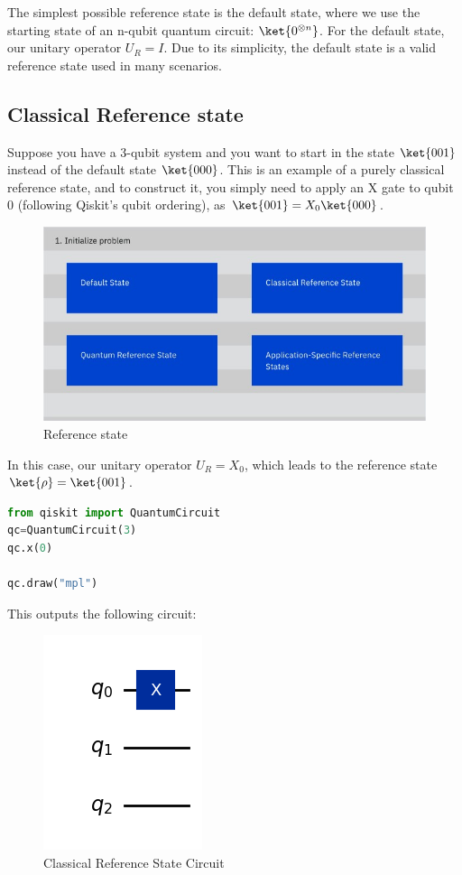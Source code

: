 \documentclass[12pt, oneside]{book}
\theoremstyle{definition}
\theoremstyle{definition}
\theoremstyle{remark}
\begin{document}
The simplest possible reference state is the default state, where we use the starting state of an n-qubit quantum circuit: $\ket{0^{\otimes n}}$. For the default state, our unitary operator $U_R=I$. Due to its simplicity, the default state is a valid reference state used in many scenarios.

\subsection{Classical Reference state}
Suppose you have a 3-qubit system and you want to start in the state $\ket{001}$ instead of the default state $\ket{000}$. This is an example of a purely classical reference state, and to construct it, you simply need to apply an X gate to qubit 0 (following Qiskit's qubit ordering), as $\ket{001}=X_0\ket{000}$.
\begin{figure}[H]
    \centering
    \includegraphics[width=0.25\linewidth]{../images/ref_state.png}
    \caption{Reference state}
    \label{fig:ref_state}
\end{figure}
In this case, our unitary operator $U_R=X_0$, which leads to the reference state $\ket{\rho}=\ket{001}$.
\begin{lstlisting}[language=Python]
from qiskit import QuantumCircuit
qc=QuantumCircuit(3)
qc.x(0)

qc.draw("mpl")
\end{lstlisting}
This outputs the following circuit:
\begin{figure}[H]
    \centering
    \includegraphics[width=0.5\linewidth]{../images/ref_state_dia.png}
    \caption{Classical Reference State Circuit}
    \label{fig:ref_state_classical}
\end{figure}
\end{document}
